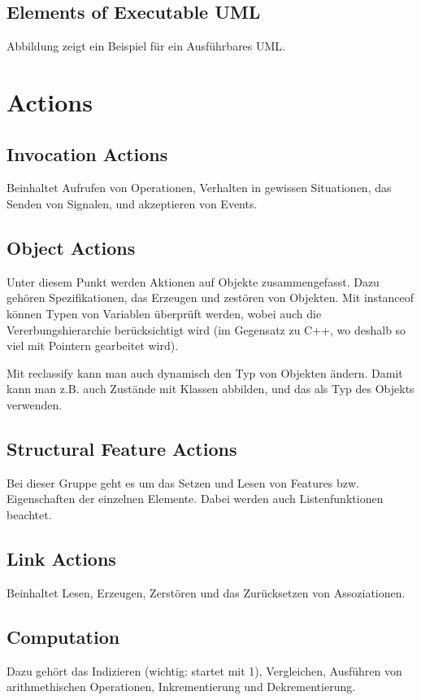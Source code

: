 \subsection{Elements of Executable UML}


Abbildung  zeigt ein Beispiel für ein Ausführbares UML.

\section{Actions}

\subsection{Invocation Actions}
Beinhaltet Aufrufen von Operationen, Verhalten in gewissen Situationen, das Senden von Signalen, und akzeptieren von Events.

\subsection{Object Actions}
Unter diesem Punkt werden Aktionen auf Objekte zusammengefasst. Dazu gehören Spezifikationen, das Erzeugen und zestören von Objekten. Mit instanceof können Typen von Variablen überprüft werden, wobei auch die Vererbungshierarchie berücksichtigt wird (im Gegensatz zu C++, wo deshalb so viel mit Pointern gearbeitet wird).

Mit reclassify kann man auch dynamisch den Typ von Objekten ändern. Damit kann man z.B. auch Zustände mit Klassen abbilden, und das als Typ des Objekts verwenden.

\subsection{Structural Feature Actions}
Bei dieser Gruppe geht es um das Setzen und Lesen von Features bzw. Eigenschaften der einzelnen Elemente. Dabei werden auch Listenfunktionen beachtet.

\subsection{Link Actions}
Beinhaltet Lesen, Erzeugen, Zerstören und das Zurücksetzen von Assoziationen.
\subsection{Computation}
Dazu gehört das Indizieren (wichtig: startet mit 1), Vergleichen, Ausführen von arithmethischen Operationen, Inkrementierung und Dekrementierung.

